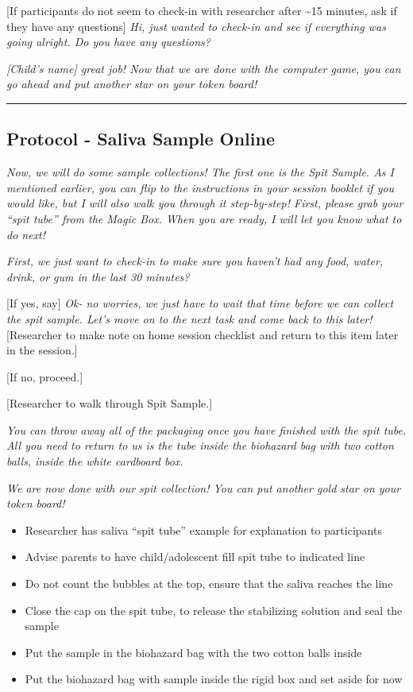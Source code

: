 \documentclass[]{book}
\begin{document}
{[}If participants do not seem to check-in with researcher after \textasciitilde{}15 minutes, ask if they have any questions{]} \emph{Hi, just wanted to check-in and see if everything was going alright. Do you have any questions?}

\emph{{[}Child's name{]} great job! Now that we are done with the computer game, you can go ahead and put another star on your token board!}

\begin{center}\rule{0.5\linewidth}{0.5pt}\end{center}

\hypertarget{protocol---saliva-sample-online-2}{%
\subsection{Protocol - Saliva Sample Online}\label{protocol---saliva-sample-online-2}}

\emph{Now, we will do some sample collections! The first one is the Spit Sample. As I mentioned earlier, you can flip to the instructions in your session booklet if you would like, but I will also walk you through it step-by-step! First, please grab your ``spit tube'' from the Magic Box. When you are ready, I will let you know what to do next!}

\emph{First, we just want to check-in to make sure you haven't had any food, water, drink, or gum in the last 30 minutes?}

{[}If yes, say{]} \emph{Ok- no worries, we just have to wait that time before we can collect the spit sample. Let's move on to the next task and come back to this later!} {[}Researcher to make note on home session checklist and return to this item later in the session.{]}

{[}If no, proceed.{]}

{[}Researcher to walk through Spit Sample.{]}

\emph{You can throw away all of the packaging once you have finished with the spit tube. All you need to return to us is the tube inside the biohazard bag with two cotton balls, inside the white cardboard box.}

\emph{We are now done with our spit collection! You can put another gold star on your token board!}

\begin{itemize}
\item
  Researcher has saliva ``spit tube'' example for explanation to participants
\item
  Advise parents to have child/adolescent fill spit tube to indicated line
\item
  Do not count the bubbles at the top, ensure that the saliva reaches the line
\item
  Close the cap on the spit tube, to release the stabilizing solution and seal the sample
\item
  Put the sample in the biohazard bag with the two cotton balls inside
\item
  Put the biohazard bag with sample inside the rigid box and set aside for now
\end{itemize}
\end{document}
